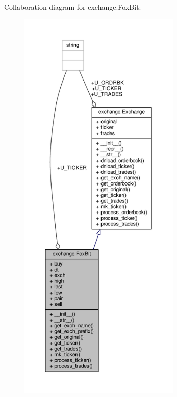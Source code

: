Collaboration diagram for exchange.\+Fox\+Bit\+:
\nopagebreak
\begin{figure}[H]
\begin{center}
\leavevmode
\includegraphics[height=550pt]{classexchange_1_1_fox_bit__coll__graph}
\end{center}
\end{figure}
